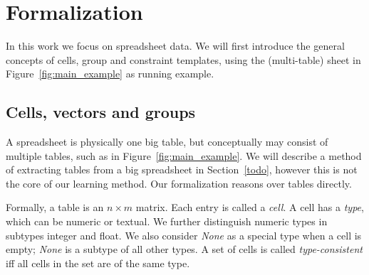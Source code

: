 \documentclass{ecai}
\begin{document}
\section{Formalization}
In this work we focus on spreadsheet data. We will first introduce the general concepts of cells, group and constraint templates, using the (multi-table) sheet in Figure~\ref{fig:main_example} as running example.

\subsection{Cells, vectors and groups}
A spreadsheet is physically one big table, but conceptually may consist of multiple tables, such as in Figure~\ref{fig:main_example}. We will describe a method of extracting tables from a big spreadsheet in Section~\ref{todo}, however this is not the core of our learning method. Our formalization reasons over tables directly.

Formally, a table is an $n \times m$ matrix. Each entry is called a \textit{cell}.
A cell has a {\em type}, which can be numeric or textual. We further distinguish numeric types in subtypes integer and float. We also consider \textit{None} as a special type when a cell is empty; \textit{None} is a subtype of all other types.
A set of cells is called \textit{type-consistent} iff all cells in the set are of the same type.
\end{document}
